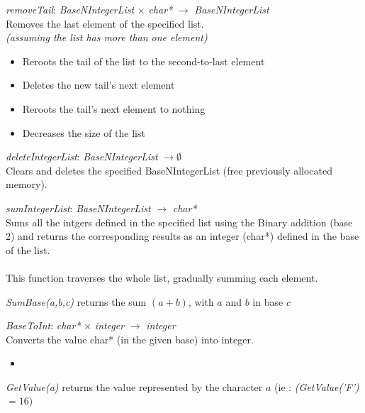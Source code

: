 \documentclass[book, backcover, english, nodocumentinfo]{upmethodology-document}
\begin{document}
		\begin{minipage}{\linewidth}
			\textit{removeTail}: \textit{BaseNIntegerList} $\times$ \textit{char*} $\rightarrow$ \textit{BaseNIntegerList}\\
			Removes the last element of the specified list.\\
			\ov \textit{ (assuming the list has more than one element)}
			\begin{itemize}
				\item Reroots the tail of the list to the second-to-last element
				\item Deletes the new tail's next element
				\item Reroots the tail's next element to nothing
				\item Decreases the size of the list
			\end{itemize}
			\label{algo:BNIL-RemoveTail}
			
		\end{minipage}
		\nxtalgo{}

		\begin{minipage}{\linewidth}
			\textit{deleteIntegerList}: \textit{BaseNIntegerList} $\rightarrow \emptyset$\\
			Clears and deletes the specified BaseNIntegerList (free previously allocated memory).\\
			\label{algo:BNIL-DeleteIntegerList}
			
		\end{minipage}
		\nxtalgo{}

		\begin{minipage}{\linewidth}
			\textit{sumIntegerList}: \textit{BaseNIntegerList} $\rightarrow$ \textit{char*}\\
			Sums all the intgers defined in the specified list using the Binary addition (base 2) and returns the corresponding results as an integer (char*) defined in the base of the list.\\
			\ov\\
			This function traverses the whole list, gradually summing each element.
			\label{algo:BNIL-SumIntegerList}
			
			\textit{SumBase(a,b,c)} returns the sum $(a+b)$, with $a$ and $b$ in base $c$
		\end{minipage}
		\nxtalgo{}

		\begin{minipage}{\linewidth}
			\textit{BaseToInt}: \textit{char*} $\times$ \textit{integer} $\rightarrow$ \textit{integer}\\
			Converts the value char* (in the given base) into integer.
			\ov\\
			\begin{itemize}
				\item 
			\end{itemize}
			\label{algo:BNIL-BaseToInt}
			
			\textit{GetValue(a)} returns the value represented by the character $a$
			(ie : \textit{(GetValue('F')} $= 16$)
		\end{minipage}
		\nxtalgo{}
\end{document}
